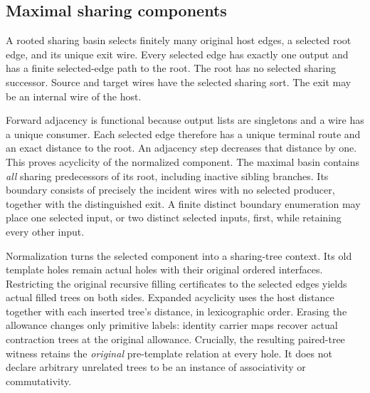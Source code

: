 \par{}

\subsection{Maximal sharing components}
A rooted sharing basin selects finitely many original host edges, a selected
root edge, and its unique exit wire. Every selected edge has exactly one
output and has a finite selected-edge path to the root. The root has no
selected sharing successor. Source and target wires have the selected
sharing sort. The exit may be an internal wire of the host.

Forward adjacency is functional because output lists are singletons and a
wire has a unique consumer. Each selected edge therefore has a unique
terminal route and an exact distance to the root. An adjacency step decreases
that distance by one. This proves acyclicity of the normalized component.
The maximal basin contains \emph{all} sharing predecessors of its root,
including inactive sibling branches. Its boundary consists of precisely the
incident wires with no selected producer, together with the distinguished
exit. A finite distinct boundary enumeration may place one selected input,
or two distinct selected inputs, first, while retaining every other input.

Normalization turns the selected component into a sharing-tree context.
Its old template holes remain actual holes with their original ordered
interfaces. Restricting the original recursive filling certificates to the
selected edges yields actual filled trees on both sides. Expanded acyclicity
uses the host distance together with each inserted tree's distance, in
lexicographic order. Erasing the allowance changes only primitive labels:
identity carrier maps recover actual contraction trees at the original
allowance. Crucially, the resulting paired-tree witness retains the
\emph{original} pre-template relation at every hole. It does not declare
arbitrary unrelated trees to be an instance of associativity or commutativity.

